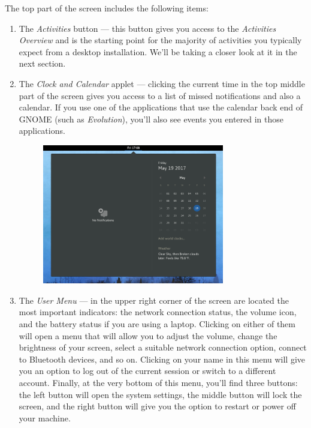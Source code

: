 The top part of the screen includes the following items:
\begin{enumerate}
\item The \emph{Activities} button --- this button gives you access to the \emph{Activities Overview} and is the starting point for the majority of activities you typically expect from a desktop installation. We'll be taking a closer look at it in the next section.

\item The \emph{Clock and Calendar} applet --- clicking the current time in the top middle part of the screen gives you access to a list of missed notifications and also a calendar. If you use one of the applications that use the calendar back end of GNOME (such as \emph{Evolution}), you'll also see events you entered in those applications.

\begin{figure}[htbp]
\begin{center}
\includegraphics[width=0.75\textwidth]{img/calendar}
 \label{fig:calendar}
\end{center}
\end{figure}

\item The \emph{User Menu} --- in the upper right corner of the screen are located the most important indicators: the network connection status, the volume icon, and the battery status if you are using a laptop. Clicking on either of them will open a menu that will allow you to adjust the volume, change the brightness of your screen, select a suitable network connection option, connect to Bluetooth devices, and so on. Clicking on your name in this menu will give you an option to log out of the current session or switch to a different account. Finally, at the very bottom of this menu, you'll find three buttons: the left button will open the system settings, the middle button will lock the screen, and the right button will give you the option to restart or power off your machine.


\end{enumerate}
